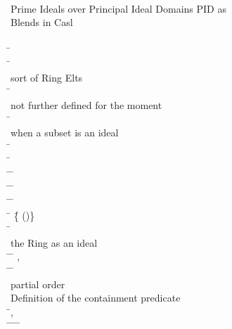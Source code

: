 \begin{hetcasl}
 \\
\\
 \\
{\small{}\KW{\%\%} Prime Ideals over Principal Ideal Domains \Ax{(}PID\Ax{)} as}\\
{\small{}\KW{\%\%} Blends in Casl}\\
\\
\SPEC \= \Ax{=}\\
\> \SORT \=\\
\>\> {\small{}\KW{\%\%} sort of Ring Elts}\\
\> \SORT \=\\
\>\> {\small{}\KW{\%\%} not further defined for the moment}\\
\> \PRED \= \Ax{:} \\
\>\> {\small{}\KW{\%\%} when a subset is an ideal}\\
\> \OP \= \Ax{:} \\
\> \OP \= \Ax{:} \\
\> \OP \=\Ax{\_\_}\Ax{*}\Ax{\_\_} \Ax{:} \= \Ax{\times}  \Ax{\rightarrow} \\
\> \OP \=\Ax{\_\_}\Ax{+}\Ax{\_\_} \Ax{:} \= \Ax{\times}  \Ax{\rightarrow} \\
\> \PRED \=\Ax{\_\_}\Ax{\_\_} \Ax{:} \= \Ax{\times} \\
\> \SORT \= \Ax{=} \=\{ \Ax{:}  \Ax{\bullet} ()\}\\
\> \OP \= \Ax{:} \\
\>\> {\small{}\KW{\%\%} the Ring as an ideal}\\
\> \OP \=\Ax{\_\_}\Ax{**}\Ax{\_\_} \Ax{:} \= \Ax{\times}  \Ax{\rightarrow} ,  \\
\> \PRED \=\Ax{\_\_}\Ax{\_\_} \Ax{:} \= \Ax{\times} \\
\>\> {\small{}\KW{\%\%} partial order}\\
\>\> {\small{}\KW{\%\%}Definition of the containment predicate}\\
\> \Ax{\forall} \=,  \Ax{:}  \\
\> \Ax{\bullet} \=   \Ax{\Leftrightarrow} \=\Ax{\forall}  \Ax{:}  \Ax{\bullet} \=   \Ax{\Rightarrow} \=  \\

\end{hetcasl}
